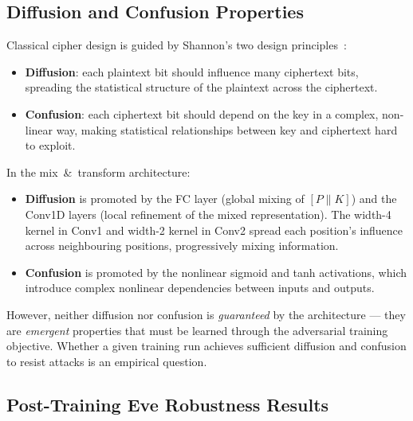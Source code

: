 \documentclass[12pt, a4paper]{article}
\begin{document}
\subsection{Diffusion and Confusion Properties}
\label{subsec:diffusion_confusion}

Classical cipher design is guided by Shannon's two design
principles~\cite{shannon1949communication}:

\begin{itemize}[leftmargin=1.8em, itemsep=4pt]
  \item \textbf{Diffusion}: each plaintext bit should influence many
        ciphertext bits, spreading the statistical structure of the
        plaintext across the ciphertext.
  \item \textbf{Confusion}: each ciphertext bit should depend on the
        key in a complex, non-linear way, making statistical
        relationships between key and ciphertext hard to exploit.
\end{itemize}

In the mix~\&~transform architecture:

\begin{itemize}[leftmargin=1.8em, itemsep=4pt]
  \item \textbf{Diffusion} is promoted by the FC layer (global mixing
        of $[P \| K]$) and the Conv1D layers (local refinement of the
        mixed representation). The width-4 kernel in Conv1 and
        width-2 kernel in Conv2 spread each position's influence
        across neighbouring positions, progressively mixing information.
  \item \textbf{Confusion} is promoted by the nonlinear sigmoid and
        tanh activations, which introduce complex nonlinear dependencies
        between inputs and outputs.
\end{itemize}

However, neither diffusion nor confusion is \emph{guaranteed} by the
architecture --- they are \emph{emergent} properties that must be
learned through the adversarial training objective. Whether a given
training run achieves sufficient diffusion and confusion to resist
attacks is an empirical question.

\subsection{Post-Training Eve Robustness Results}
\label{subsec:robustness_results}
\end{document}
